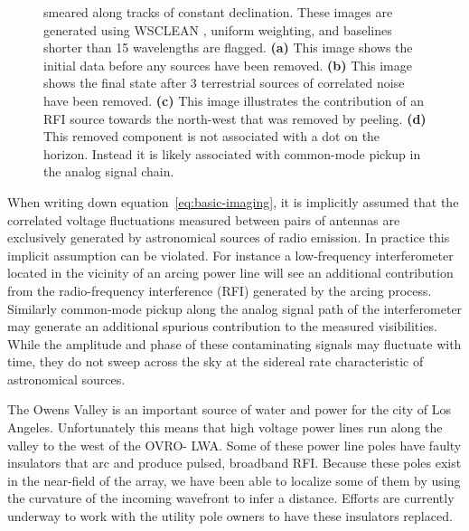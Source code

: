 \documentclass[twocolumn]{aastex6}
\begin{document}
\begin{figure}[ht]
{        smeared along tracks of constant declination. These images are generated using WSCLEAN
        \citep{2014MNRAS.444..606O}, uniform weighting, and baselines shorter than 15 wavelengths
        are flagged. \textbf{(a)} This image shows the initial data before any sources have been
        removed. \textbf{(b)} This image shows the final state after 3 terrestrial sources of
        correlated noise have been removed. \textbf{(c)} This image illustrates the contribution of
        an RFI source towards the north-west that was removed by peeling. \textbf{(d)} This removed
        component is not associated with a dot on the horizon.  Instead it is likely associated with
        common-mode pickup in the analog signal chain.
    }
    \label{fig:fitrfi}
\end{figure}


When writing down equation~\ref{eq:basic-imaging}, it is implicitly assumed that the correlated
voltage fluctuations measured between pairs of antennas are exclusively generated by astronomical
sources of radio emission. In practice this implicit assumption can be violated. For instance a
low-frequency interferometer located in the vicinity of an arcing power line will see an additional
contribution from the radio-frequency interference (RFI) generated by the arcing process. Similarly
common-mode pickup along the analog signal path of the interferometer may generate an additional
spurious contribution to the measured visibilities. While the amplitude and phase of these
contaminating signals may fluctuate with time, they do not sweep across the sky at the sidereal rate
characteristic of astronomical sources.

The Owens Valley is an important source of water and power for the city of Los Angeles.
Unfortunately this means that high voltage power lines run along the valley to the west of the OVRO-
LWA. Some of these power line poles have faulty insulators that arc and produce pulsed, broadband
RFI. Because these poles exist in the near-field of the array, we have been able to localize some of
them by using the curvature of the incoming wavefront to infer a distance. Efforts are currently
underway to work with the utility pole owners to have these insulators replaced.
\end{document}
